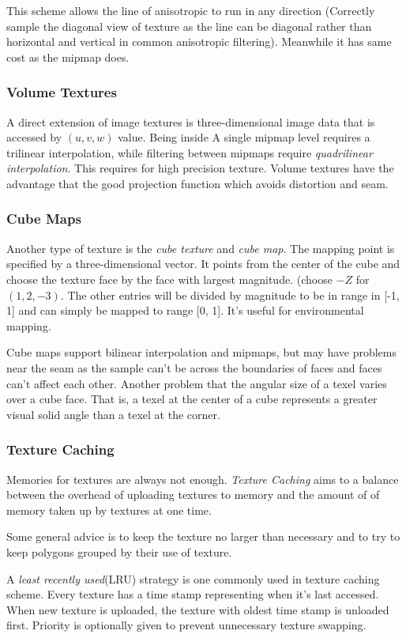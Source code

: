 \documentclass[10pt, a4paper]{article}
\begin{document}
    This scheme allows the line of anisotropic to run in any direction (Correctly sample the diagonal view of texture as the line can be diagonal rather than horizontal and vertical in common anisotropic filtering). Meanwhile it has same cost as the mipmap does. 
\subsubsection{Volume Textures}
    A direct extension of image textures is three-dimensional image data that is accessed by $(u, v, w)$ value. Being inside A single mipmap level requires a trilinear interpolation, while filtering between mipmaps require \emph{quadrilinear interpolation}. This requires for high precision texture. Volume textures have the advantage that the good projection function which avoids distortion and seam. 
    
\subsubsection{Cube Maps}
    Another type of texture is the \emph{cube texture} and \emph{cube map}. The mapping point is specified by a three-dimensional vector. It points from the center of the cube and choose the texture face by the face with largest magnitude. (choose $-Z$ for $(1, 2, -3)$. The other entries will be divided by magnitude to be in range in [-1, 1] and can simply be mapped to range [0, 1]. It's useful for environmental mapping.

    Cube maps support bilinear interpolation and mipmaps, but may have problems near the seam as the sample can't be across the boundaries of faces and faces can't affect each other. Another problem that the angular size of a texel varies over a cube face.  That is, a texel at the center of a cube represents a greater visual solid angle than a texel at the corner. 

\subsubsection{Texture Caching}
     Memories for textures are always not enough. \emph{Texture Caching} aims to a balance between the overhead of uploading textures to memory and the amount of of memory taken up by textures at one time. 

     Some general advice is to keep the texture no larger than necessary and to try to keep polygons grouped by their use of texture. 

     A \emph{least recently used}(LRU) strategy is one commonly used in texture caching scheme. Every texture has a time stamp representing when it's last accessed. When new texture is uploaded, the texture with oldest time stamp is unloaded first. Priority is optionally given to prevent unnecessary texture swapping. 
\end{document}
